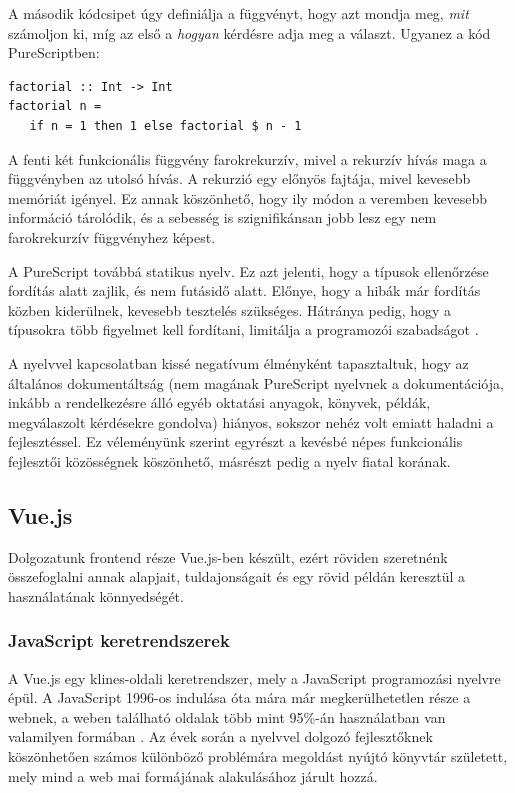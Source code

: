 \documentclass[12pt]{article}
\begin{document}
A második kódcsipet úgy definiálja a függvényt, hogy azt mondja meg, \textit{mit} számoljon ki, míg az első a \textit{hogyan} kérdésre adja meg a választ. Ugyanez a kód PureScriptben:

\begin{verbatim}
factorial :: Int -> Int
factorial n =
   if n = 1 then 1 else factorial $ n - 1
\end{verbatim}

A fenti két funkcionális függvény farokrekurzív, mivel a rekurzív hívás maga a függvényben az utolsó hívás. A rekurzió egy előnyös fajtája, mivel kevesebb memóriát igényel. Ez annak köszönhető, hogy ily módon a veremben kevesebb információ tárolódik, és a sebesség is szignifikánsan jobb lesz egy nem farokrekurzív függvényhez képest.

A PureScript továbbá statikus nyelv.  Ez azt jelenti, hogy a típusok ellenőrzése fordítás alatt zajlik, és nem futásidő alatt. Előnye, hogy a hibák már fordítás közben kiderülnek,  kevesebb tesztelés szükséges. Hátránya pedig, hogy a típusokra több figyelmet kell fordítani, limitálja a programozói szabadságot \cite{CS}.

A nyelvvel kapcsolatban kissé negatívum élményként tapasztaltuk, hogy az általános dokumentáltság (nem magának PureScript nyelvnek a dokumentációja, inkább a rendelkezésre álló egyéb oktatási anyagok, könyvek, példák, megválaszolt kérdésekre gondolva) hiányos, sokszor nehéz volt emiatt haladni a fejlesztéssel. Ez véleményünk szerint egyrészt a kevésbé népes funkcionális fejlesztői közösségnek köszönhető, másrészt pedig a nyelv fiatal korának.

\newpage
\subsection{Vue.js}

Dolgozatunk frontend része Vue.js-ben készült,  ezért röviden szeretnénk összefoglalni annak alapjait, tuldajonságait és egy rövid példán keresztül a használatának könnyedségét.

\subsubsection{JavaScript keretrendszerek}

A Vue.js egy klines-oldali keretrendszer, mely a JavaScript programozási nyelvre épül. A JavaScript 1996-os indulása óta mára már megkerülhetetlen része a webnek, a weben található oldalak több mint 95\%-án használatban van valamilyen formában \cite{JS_USAGE}. Az évek során a nyelvvel dolgozó fejlesztőknek köszönhetően számos különböző problémára megoldást nyújtó könyvtár született, mely mind a web mai formájának alakulásához járult hozzá.
\end{document}
